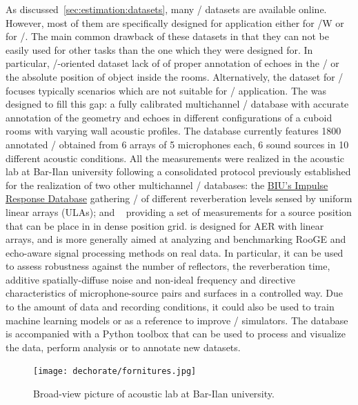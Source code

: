 As discussed~\cref{sec:estimation:datasets}, many \RIRs/ datasets are available online.
However, most of them are specifically designed for application either for \SEdef/W or for \RooGEdef/.
The main common drawback of these datasets in that they can not be easily used for other tasks than the one which they were designed for.
In particular, \SE/-oriented dataset lack of of proper annotation of echoes in the \RIRs/ or the absolute position of object inside the rooms.
Alternatively, the dataset for \RooGE/ focuses typically scenarios which are not suitable for \SE/ application.
The \dEchorate{} was designed to fill this gap: a fully calibrated multichannel \RIR/ database with accurate annotation of the geometry and echoes in different configurations of a cuboid rooms with varying wall acoustic profiles.
The database currently features 1800 annotated \RIRs/ obtained from 6 arrays of 5 microphones each, 6 sound sources in 10 different acoustic conditions.
All the measurements were realized in the acoustic lab at Bar-Ilan university following a consolidated protocol previously established for the realization of two other multichannel \RIRs/ databases:
the \href{http://www.eng.biu.ac.il/~gannot/RIR_DATABASE/}{BIU's Impulse Response Database}  gathering \RIRs/ of different reverberation levels sensed by uniform linear arrays (ULAs);
and \href{https://asap.ite.tul.cz/downloads/MIRaGe/}{}~ providing a set of measurements for a source position that can be place in in dense position grid.
\dEchorate{} is designed for AER with linear arrays, and is more generally aimed at analyzing and benchmarking RooGE and echo-aware signal processing methods on real data.
In particular, it can be used to assess robustness against the number of reflectors, the reverberation time, additive spatially-diffuse noise and non-ideal frequency and directive characteristics of microphone-source pairs and surfaces in a controlled way.
Due to the amount of data and recording conditions, it could also be used to train machine learning models or as a reference to improve \RIR/ simulators.
The database is accompanied with a Python toolbox that can be used to process and visualize the data, perform analysis or to annotate new datasets.

\begin{figure}[t]
    \begin{fullwidth}
        \centering
        \texttt{[image: dechorate/fornitures.jpg]}
        \caption{Broad-view picture of acoustic lab at Bar-Ilan university.}
        \label{fig:dechorate:room}
    \end{fullwidth}
\end{figure}


